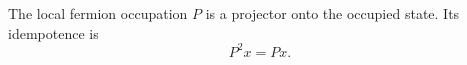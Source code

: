 \documentclass{article}
\begin{document}
The local fermion occupation $P$ is a projector onto the occupied state.
Its idempotence is
\begin{equation}
P^2 x = P x .
\label{eq:projector}
\end{equation}
\end{document}
